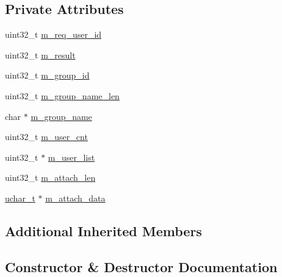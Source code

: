 \subsection*{Private Attributes}
\begin{DoxyCompactItemize}
\item 
uint32\+\_\+t \hyperlink{class_c_im_pdu_group_create_tmp_group_response_a859630f7992f3f50ade6a434d4a1d433}{m\+\_\+req\+\_\+user\+\_\+id}
\item 
uint32\+\_\+t \hyperlink{class_c_im_pdu_group_create_tmp_group_response_abf49a87252311f4f36fd2f1866d012fb}{m\+\_\+result}
\item 
uint32\+\_\+t \hyperlink{class_c_im_pdu_group_create_tmp_group_response_a229c0360069b8565f0d7170d36546f08}{m\+\_\+group\+\_\+id}
\item 
uint32\+\_\+t \hyperlink{class_c_im_pdu_group_create_tmp_group_response_a9e719f318176a4bd829e7b9f42209a14}{m\+\_\+group\+\_\+name\+\_\+len}
\item 
char $\ast$ \hyperlink{class_c_im_pdu_group_create_tmp_group_response_af6b9a672c283879829e729cb4b88f0c8}{m\+\_\+group\+\_\+name}
\item 
uint32\+\_\+t \hyperlink{class_c_im_pdu_group_create_tmp_group_response_af929ce129af88c77db9fed112660b315}{m\+\_\+user\+\_\+cnt}
\item 
uint32\+\_\+t $\ast$ \hyperlink{class_c_im_pdu_group_create_tmp_group_response_a705e72c3340aaf8a4b8e8ca99158ea3c}{m\+\_\+user\+\_\+list}
\item 
uint32\+\_\+t \hyperlink{class_c_im_pdu_group_create_tmp_group_response_aa57c05dcad4488d6e27e42471a5b7ef3}{m\+\_\+attach\+\_\+len}
\item 
\hyperlink{base_2ostype_8h_a124ea0f8f4a23a0a286b5582137f0b8d}{uchar\+\_\+t} $\ast$ \hyperlink{class_c_im_pdu_group_create_tmp_group_response_aa9e3be6cc1284db28263eeb79c8b0d0a}{m\+\_\+attach\+\_\+data}
\end{DoxyCompactItemize}
\subsection*{Additional Inherited Members}


\subsection{Constructor \& Destructor Documentation}
\hypertarget{class_c_im_pdu_group_create_tmp_group_response_afcfa7efdfbac20e555b8a6bf145dcd3a}{}
